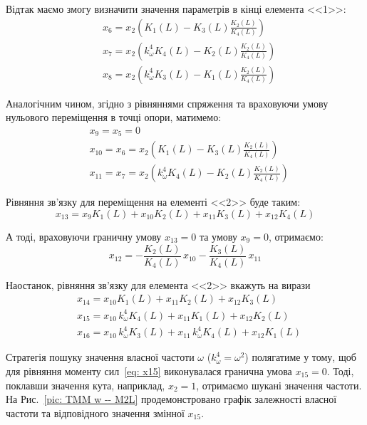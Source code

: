 \documentclass{mathreport}
\begin{document}
Відтак маємо змогу визначити значення параметрів в кінці елемента <<1>>:
\begin{align}\label{eq: x6 x7 x8}
    & x_6 = x_2 \left( K_1(L) - K_3(L)\frac{K_2(L)}{K_4(L)} \right) \\
    & x_7 = x_2 \left( k_{\omega}^4 K_4(L) - K_2(L)\frac{K_2(L)}{K_4(L)} \right) \\
    & x_8 = x_2 \left( k_{\omega}^4 K_3(L) - K_1(L)\frac{K_2(L)}{K_4(L)} \right)
\end{align}

Аналогічним чином, згідно з рівняннями спряження та враховуючи умову нульового переміщення в точці опори, матимемо:
\begin{align}\label{eq: x10 x11 x12}
    & x_9 = x_5 = 0 \\
    & x_{10} = x_6 = x_2 \left( K_1(L) - K_3(L)\frac{K_2(L)}{K_4(L)} \right) \\
    & x_{11} = x_7 = x_2 \left( k_{\omega}^4 K_4(L) - K_2(L)\frac{K_2(L)}{K_4(L)} \right)
\end{align}

Рівняння зв'язку для переміщення на елементі <<2>> буде таким:
\begin{equation}\label{eq: x13}
    x_{13} = x_{9} K_1(L) + x_{10} K_2(L) + x_{11} K_3(L) + x_{12} K_4(L)
\end{equation}

А тоді, враховуючи граничну умову $x_{13}=0$ та умову $x_{9}=0$, отримаємо:
\begin{equation}\label{eq: x13 final}
    x_{12} = -\frac{K_2(L)}{K_4(L)}\,x_{10} - \frac{K_3(L)}{K_4(L)}\,x_{11}
\end{equation}

Наостанок, рівняння зв'язку для елемента <<2>> вкажуть на вирази
\begin{align}
    & x_{14} = x_{10} K_1(L) + x_{11} K_2(L) + x_{12} K_3(L) \label{eq: x14} \\
    & x_{15} = x_{10}\, k_{\omega}^4 K_4(L) + x_{11} K_1(L) + x_{12} K_2(L) \label{eq: x15} \\
    & x_{16} = x_{10}\, k_{\omega}^4 K_3(L) + x_{11}\, k_{\omega}^4 K_4(L) + x_{12} K_1(L) \label{eq: x16}
\end{align}

Стратегія пошуку значення власної частоти $\omega$ ($k_{\omega}^4=\omega^2$) полягатиме у тому, щоб для рівняння моменту сил~\eqref{eq: x15} виконувалася гранична умова $x_{15}=0$. Тоді, поклавши значення кута, наприклад, $x_2=1$, отримаємо шукані значення частоти. На Рис.~\ref{pic: TMM w -- M2L} продемонстровано графік залежності власної частоти та відповідного значення змінної $x_{15}$.
\end{document}
